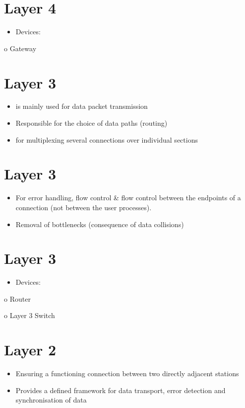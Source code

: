 \documentclass[10pt]{article}
\begin{document}
\section{Layer 4}
\begin{itemize}
  \item Devices:
\end{itemize}

o Gateway

\section{Layer 3}
\begin{itemize}
  \item is mainly used for data packet
transmission

  \item Responsible for the choice of data
paths (routing)

  \item for multiplexing several connections over individual sections

\end{itemize}

\section{Layer 3}
\begin{itemize}
  \item For error handling, flow control \& flow control between the endpoints of a connection (not between the user processes).

  \item Removal of bottlenecks (consequence of data
collisions)

\end{itemize}

\section{Layer 3}
\begin{itemize}
  \item Devices:
\end{itemize}

o Router

o Layer 3 Switch

\section{Layer 2}
\begin{itemize}
  \item Ensuring a functioning connection between two directly adjacent stations

  \item Provides a defined framework for data transport, error detection and synchronisation of data

\end{itemize}
\end{document}

